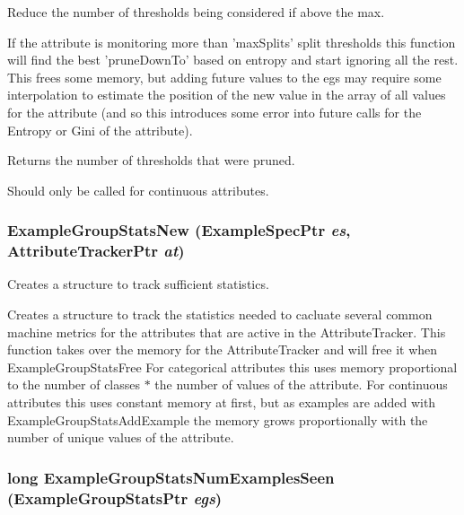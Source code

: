 Reduce the number of thresholds being considered if above the max. 

If the attribute is monitoring more than 'max\-Splits' split thresholds this function will find the best 'prune\-Down\-To' based on entropy and start ignoring all the rest. This frees some memory, but adding future values to the egs may require some interpolation to estimate the position of the new value in the array of all values for the attribute (and so this introduces some error into future calls for the Entropy or Gini of the attribute).

Returns the number of thresholds that were pruned.

Should only be called for continuous attributes. 
\subsubsection{ Example\-Group\-Stats\-New ({\bf Example\-Spec\-Ptr} {\em es}, Attribute\-Tracker\-Ptr {\em at})}\label{ExampleGroupStats_8h_a20}


Creates a structure to track sufficient statistics. 

Creates a structure to track the statistics needed to cacluate several common machine metrics for the attributes that are active in the Attribute\-Tracker. This function takes over the memory for the Attribute\-Tracker and will free it when Example\-Group\-Stats\-Free For categorical attributes this uses memory proportional to the number of classes $\ast$ the number of values of the attribute. For continuous attributes this uses constant memory at first, but as examples are added with Example\-Group\-Stats\-Add\-Example the memory grows proportionally with the number of unique values of the attribute. 
\subsubsection{\setlength{\rightskip}{0pt plus 5cm}long Example\-Group\-Stats\-Num\-Examples\-Seen ({\bf Example\-Group\-Stats\-Ptr} {\em egs})}\label{ExampleGroupStats_8h_a26}


